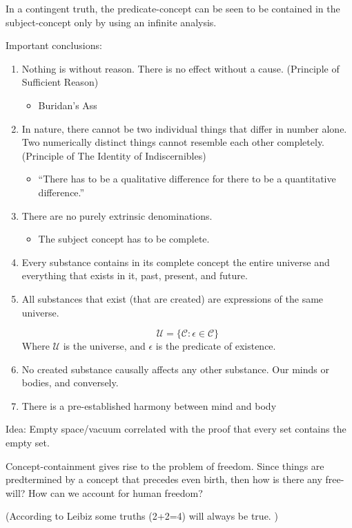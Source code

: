 \documentclass{article}
\begin{document}
\begin{spacing}{1.2}
        In a contingent truth, the predicate-concept can be seen to be contained in the subject-concept only by using an infinite analysis.

        Important conclusions:
        \begin{enumerate}
          \item Nothing is without reason. There is no effect without a cause. (Principle of Sufficient Reason)
          \begin{itemize}
            \item Buridan's Ass
          \end{itemize}
          \item In nature, there cannot be two individual things that differ in number alone. Two numerically distinct things cannot resemble each other completely. (Principle of The Identity of Indiscernibles)
          \begin{itemize}
              \item ``There has to be a qualitative difference for there to be a quantitative difference.''
          \end{itemize}
          \item There are no purely extrinsic denominations.
          \begin{itemize}
              \item The subject concept has to be complete.
          \end{itemize}
          \item Every substance contains in its complete concept the entire universe and everything that exists in it, past, present, and future.

          \item All substances that exist (that are created) are expressions of the same universe.

          $$\mathcal U = \{\mathcal C \colon \epsilon\in\mathcal C\}$$
          Where $\mathcal U$ is the universe, and $\epsilon$ is the predicate of existence.

          \item No created substance causally affects any other substance. Our minds or bodies, and conversely.

          \item There is a pre-established harmony between mind and body
        \end{enumerate}

        Idea: Empty space/vacuum correlated with the proof that every set contains the empty set.

        Concept-containment gives rise to the problem of freedom. Since things are predtermined by a concept that precedes even birth, then how is there any free-will? How can we account for human freedom?


        (According to Leibiz some truths (2+2=4) will always be true. )
    \end{spacing}
    
\end{document}
